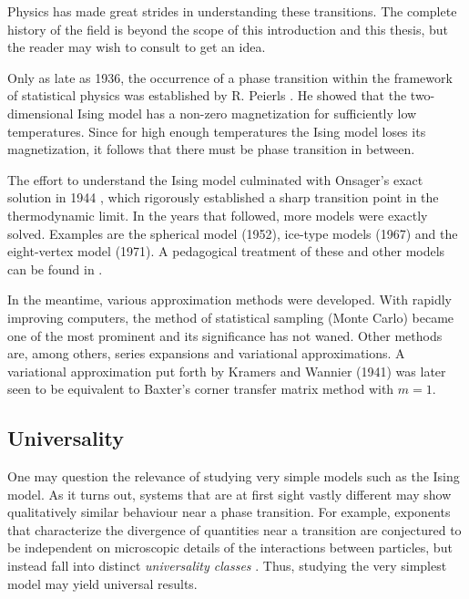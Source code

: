Physics has made great strides in understanding these transitions. The
complete history of the field is beyond the scope of this introduction and this
thesis, but the reader may wish to consult \cite{kadanoff2009more,
domb1996critical} to get an idea.

Only as late as 1936, the occurrence of a phase transition
within the framework of statistical physics was established by R. Peierls
\cite{peierls1936on_ising}. He showed that the two-dimensional Ising model
has a non-zero magnetization for sufficiently low temperatures. Since for
high enough temperatures the Ising model loses its magnetization, it
follows that there must be phase transition in between.

The effort to understand the Ising model culminated with Onsager's exact solution in 1944
\cite{onsager1944two_dimensional}, which rigorously established a sharp transition point in the thermodynamic limit.
In the years that followed, more models were exactly solved.
Examples are the spherical model \cite{berlin1952spherical} (1952),
ice-type models \cite{sutherland1967exact} (1967) and the eight-vertex model \cite{baxter1971eight-vertex} (1971).
A pedagogical treatment of these and other models can be found in \cite{baxter1982exactly}.

In the meantime, various approximation methods were developed.
With rapidly improving computers, the method of statistical sampling (Monte Carlo) became one of the most prominent and
its significance has not waned.
Other methods are, among others, series expansions and variational approximations.
A variational approximation put forth by Kramers and Wannier (1941) \cite{kramers1941statistics} was later seen to be
equivalent to Baxter's corner transfer matrix method with $m = 1$.

\subsection{Universality}
One may question the relevance of studying very simple models such as the
Ising model. As it turns out, systems that are at first sight vastly
different may show qualitatively similar behaviour near a phase
transition. For example, exponents that characterize the divergence of
quantities near a transition are conjectured to be independent on
microscopic details of the interactions between particles, but instead
fall into distinct \emph{universality classes}
\cite{griffiths1970dependence, fisher1966quantum}. Thus, studying the very
simplest model may yield universal results.

